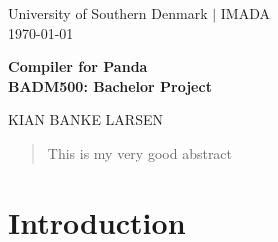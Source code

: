 
\usepackage{amssymb}

\usepackage[block=ragged, sorting=nyt, style=authoryear-ibid, backend=biber]{biblatex}
\setlength{}


\pagestyle{fancy}
\setlength{\headsep}{15pt}
\setlength{\headheight}{15pt}
\rhead{\datedate}


\begin{titlepage}
\begin{centering}
\vspace*{-20px}\large University of Southern Denmark $|$ IMADA \\
\today \\

\vspace{4CM}

\huge{\bf  Compiler for Panda} \\
\Large{\bf BADM500: Bachelor Project}

\vspace{\fill}

\fontsize{16}{19.2} {
    \selectfont
    KIAN BANKE LARSEN
} \\

\vspace{\fill}

\vspace*{-0.95cm} %

\end{centering}

\thispagestyle{empty}
\end{titlepage}

\newpage
\setcounter{page}{0}
\thispagestyle{empty}

\begin{abstract}
    This is my very good abstract
\end{abstract}

{ \hypersetup{hidelinks} \tableofcontents }

\chapter{Introduction}
\parencite{communcation4}

\cleardoublepage
{}
{}
\printbibliography
